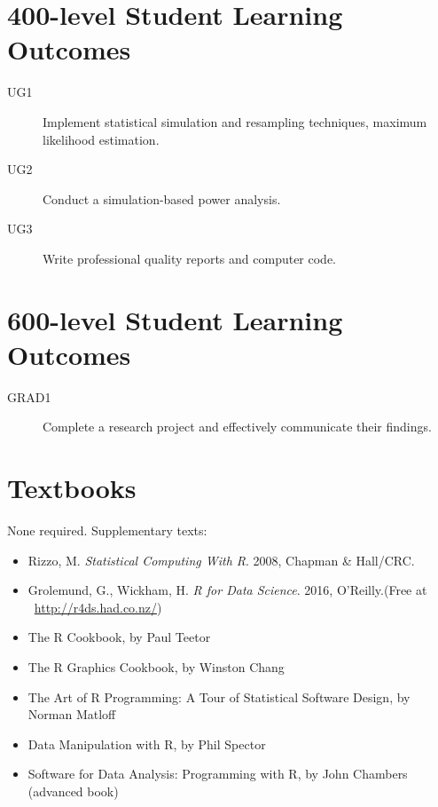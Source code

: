 \documentclass[11pt,onecolumn]{article}
\begin{document}
\section*{400-level Student Learning Outcomes}
\begin{description}
\item[UG1] Implement statistical simulation and resampling techniques, maximum likelihood estimation. 
\item[UG2] Conduct a simulation-based power analysis. 
\item[UG3] Write professional quality reports and computer code. 
\end{description}

\section*{600-level Student Learning Outcomes}
\begin{description}
\item[GRAD1] Complete a research project and effectively communicate their findings.
\end{description}

\clearpage
\section*{Textbooks}
None required. Supplementary texts:
\begin{itemize} 
\item Rizzo, M. \emph{Statistical Computing With R}. 2008, Chapman \& Hall/CRC.
\item Grolemund, G., Wickham, H. \emph{R for Data Science}. 2016, O’Reilly.(Free at ~\url{http://r4ds.had.co.nz/})
\item The R Cookbook, by Paul Teetor
\item The R Graphics Cookbook, by Winston Chang
\item The Art of R Programming: A Tour of Statistical Software Design, by Norman Matloff
\item Data Manipulation with R, by Phil Spector
\item Software for Data Analysis: Programming with R, by John Chambers (advanced book)
\end{itemize}
\end{document}
